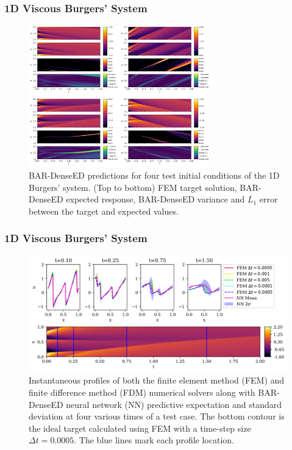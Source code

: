 \documentclass{beamer}
\theoremstyle{remark}
\begin{document}
\begin{frame}
\frametitle{1D Viscous Burgers' System}
\begin{figure}[H]
    \centering
    \includegraphics[width=0.7\textwidth]{Fig13.png}
    \caption{BAR-DenseED predictions for four test initial conditions of the 1D Burgers' system. (Top to bottom) FEM target solution, BAR-DenseED expected response, BAR-DenseED variance and $L_1$ error between the target and expected values.}
    \label{fig:burgers1D-BARDenseED}
\end{figure}
\end{frame}


\begin{frame}
\frametitle{1D Viscous Burgers' System}

\begin{figure}[H]
    \centering
    \includegraphics[width=\textwidth]{Fig14.png}
    \caption{Instantaneous profiles of both the finite element method (FEM) and finite difference method (FDM) numerical solvers along with BAR-DenseED neural network (NN) predictive expectation and standard deviation at four various times of a test case.
    The bottom contour is the ideal target calculated using FEM with a time-step size $\Delta t =0.0005$.
    The blue lines mark each profile location.}
    \label{fig:burgers1D-profile1}
\end{figure}
\end{frame}
\end{document}

